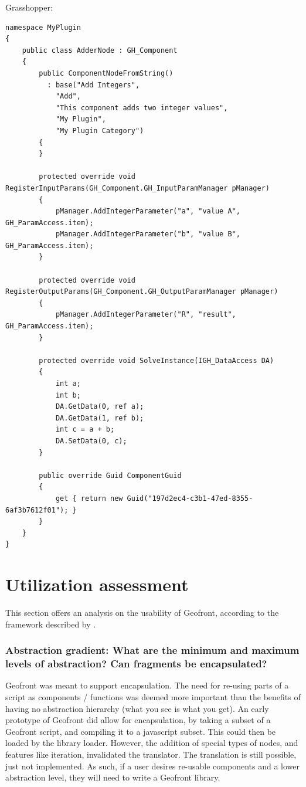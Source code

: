 Grasshopper: 

\begin{lstlisting}
namespace MyPlugin
{
    public class AdderNode : GH_Component
    {
        public ComponentNodeFromString()
          : base("Add Integers",
            "Add",
            "This component adds two integer values",
            "My Plugin",
            "My Plugin Category")
        {
        }

        protected override void RegisterInputParams(GH_Component.GH_InputParamManager pManager)
        {
            pManager.AddIntegerParameter("a", "value A", GH_ParamAccess.item);
            pManager.AddIntegerParameter("b", "value B", GH_ParamAccess.item);
        }

        protected override void RegisterOutputParams(GH_Component.GH_OutputParamManager pManager)
        {
            pManager.AddIntegerParameter("R", "result", GH_ParamAccess.item);
        }

        protected override void SolveInstance(IGH_DataAccess DA)
        {
            int a;
            int b;
            DA.GetData(0, ref a);
            DA.GetData(1, ref b);
            int c = a + b;
            DA.SetData(0, c);
        }

        public override Guid ComponentGuid
        {
            get { return new Guid("197d2ec4-c3b1-47ed-8355-6af3b7612f01"); }
        }
    }
}
\end{lstlisting}


\section{Utilization assessment}
\label{sec:testing:usability}


This section offers an analysis on the usability of Geofront, according to the framework described by \cite[]{green_usability_1996}.

\subsubsection*{Abstraction gradient: What are the minimum and maximum levels of abstraction? Can fragments be encapsulated?}

Geofront was meant to support encapsulation. 
The need for re-using parts of a script as components / functions was deemed more important than the benefits of having no abstraction hierarchy (what you see is what you get).
An early prototype of Geofront did allow for encapsulation, by taking a subset of a Geofront script, and compiling it to a javascript subset. This could then be loaded by the library loader. 
However, the addition of special types of nodes, and features like iteration, invalidated the  translator.
The translation is still possible, just not implemented.  
As such, if a user desires re-usable components and a lower abstraction level, they will need to write a Geofront library.

